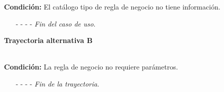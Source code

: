 \noindent \textbf{Condición:} El catálogo tipo de regla de negocio no tiene información.
\begin{enumerate}
	\UCpaso[\UCsist] Muestra el mensaje  en la pantalla  para indicar que no es posible realizar la operación debido a la falta de información necesaria para el sistema.
	\item[- -] - - {\em {Fin del caso de uso}}.%
\end{enumerate}
\hypertarget{CU8-1:TAB}{\textbf{Trayectoria alternativa B}}\\
\noindent \textbf{Condición:} La regla de negocio no requiere parámetros.
\begin{enumerate}
	\UCpaso[\UCactor] Continúa con el paso \ref{CU8.1-P9} de la trayectoria principal.
	\item[- -] - - {\em {Fin de la trayectoria}}.%
\end{enumerate}
	
